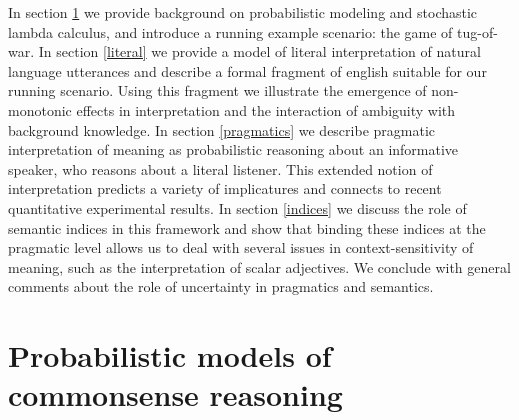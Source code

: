 \documentclass[pdfextras]{handbook}
\begin{document}
In section \ref{commonsense} we provide background on probabilistic modeling and stochastic lambda calculus, and introduce a running example scenario: the game of tug-of-war. In section \ref{literal} we provide a model of literal interpretation of natural language utterances and describe a formal fragment of english suitable for our running scenario. Using this fragment we illustrate the emergence of non-monotonic effects in interpretation and the interaction of ambiguity with background knowledge. In section \ref{pragmatics} we describe pragmatic interpretation of meaning as probabilistic reasoning about an informative speaker, who reasons about a literal listener. This extended notion of interpretation predicts a variety of implicatures and connects to recent quantitative experimental results. In section \ref{indices} we discuss the role of semantic indices in this framework and show that binding these indices at the pragmatic level allows us to deal with several issues in context-sensitivity of meaning, such as the interpretation of scalar adjectives. We conclude with general comments about the role of uncertainty in pragmatics and semantics.



\section{Probabilistic models of commonsense reasoning}
\label{commonsense}


  
  
  
  
\end{document}
